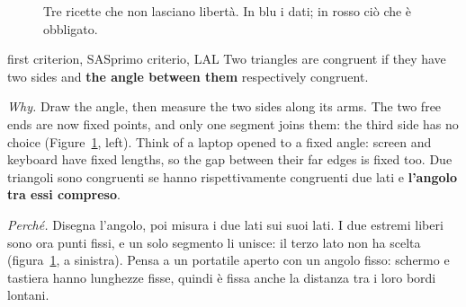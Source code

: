 \begin{figure}[htbp]
%
      {Tre ricette che non lasciano libertà. In blu i dati; in rosso ciò che è obbligato.}
\label{fig:criteria}
\end{figure}

\begin{defn}{first criterion, SAS}{primo criterio, LAL}
Two triangles are congruent if they have two sides and \textbf{the angle between them} respectively congruent.

\emph{Why.} Draw the angle, then measure the two sides along its arms. The two free ends are now fixed points, and only one segment joins them: the third side has no choice (Figure~\ref{fig:criteria}, left). Think of a laptop opened to a fixed angle: screen and keyboard have fixed lengths, so the gap between their far edges is fixed too.
\tcblower
Due triangoli sono congruenti se hanno rispettivamente congruenti due lati e \textbf{l'angolo tra essi compreso}.

\emph{Perché.} Disegna l'angolo, poi misura i due lati sui suoi lati. I due estremi liberi sono ora punti fissi, e un solo segmento li unisce: il terzo lato non ha scelta (figura~\ref{fig:criteria}, a sinistra). Pensa a un portatile aperto con un angolo fisso: schermo e tastiera hanno lunghezze fisse, quindi è fissa anche la distanza tra i loro bordi lontani.
\end{defn}

